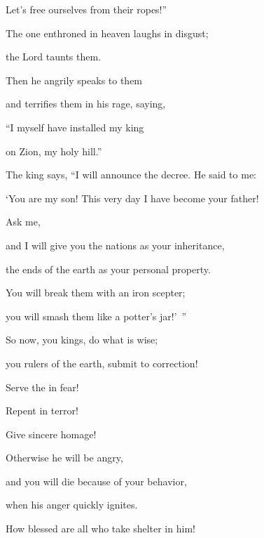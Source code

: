 {\par }{\Q Let’s
free ourselves from
their ropes!”
\par }{\Q {}The one enthroned in
heaven
laughs
in disgust;

\par }{\Q the Lord
taunts them.
\par }{\Q {}Then
he angrily
speaks
to
them
\par }{\Q and terrifies
them in his rage, saying,
\par }{\Q {}“I myself
have installed
my king
\par }{\Q on
Zion,
my holy
hill.”
\par }{\Q {}The king
says, “I will announce
the
{}
decree.
He said
to me:

\par }{\Q ‘You
are my son! This very day
I
have become your father!
\par }{\Q {}Ask
me,
\par }{\Q and I will give
you the nations
as your inheritance,
\par }{\Q the ends
of the earth
as your personal property.
\par }{\Q {}You will break
them with an iron
scepter;
\par }{\Q you will smash
them like a potter’s
jar!’ ”
\par }{\Q {}So now,
you kings,
do what is wise;
\par }{\Q you rulers
of the earth,
submit to correction!
\par }{\Q {}Serve
the {}
in fear!
\par }{\Q Repent
in terror!
\par }{\Q {}Give sincere homage!

\par }{\Q Otherwise
he will be angry,
\par }{\Q and you will die
because
of your behavior,
\par }{\Q when his anger
quickly
ignites.
\par }{\Q How blessed
are all
who take shelter in him!


\par }
